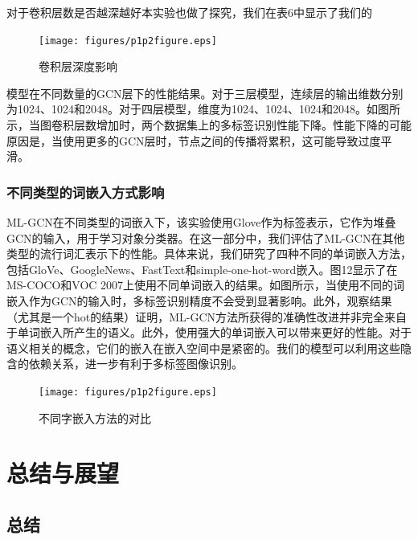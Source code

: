 对于卷积层数是否越深越好本实验也做了探究，我们在表6中显示了我们的
\begin{figure}[htbp!]
	\centering
	\texttt{[image: figures/p1p2figure.eps]}
	\caption{卷积层深度影响}\label{fig:simuP1P2Result}
	\vspace{-1em}
\end{figure}

模型在不同数量的GCN层下的性能结果。对于三层模型，连续层的输出维数分别为1024、1024和2048。对于四层模型，维度为1024、1024、1024和2048。如图所示，当图卷积层数增加时，两个数据集上的多标签识别性能下降。性能下降的可能原因是，当使用更多的GCN层时，节点之间的传播将累积，这可能导致过度平滑。

\subsection{不同类型的词嵌入方式影响}

ML-GCN在不同类型的词嵌入下，该实验使用Glove\cite{Xue2011Correlative}作为标签表示，它作为堆叠GCN的输入，用于学习对象分类器。在这一部分中，我们评估了ML-GCN在其他类型的流行词汇表示下的性能。具体来说，我们研究了四种不同的单词嵌入方法，包括GloVe\cite{Xue2011Correlative}、GoogleNews\cite{Guo2011Multi}、FastText和simple-one-hot-word嵌入。图12显示了在MS-COCO和VOC 2007上使用不同单词嵌入的结果。如图所示，当使用不同的词嵌入作为GCN的输入时，多标签识别精度不会受到显著影响。此外，观察结果（尤其是一个hot的结果）证明，ML-GCN方法所获得的准确性改进并非完全来自于单词嵌入所产生的语义。此外，使用强大的单词嵌入可以带来更好的性能。对于语义相关的概念，它们的嵌入在嵌入空间中是紧密的。我们的模型可以利用这些隐含的依赖关系，进一步有利于多标签图像识别。

\begin{figure}[htbp!]
	\centering
	\texttt{[image: figures/p1p2figure.eps]}
	\caption{不同字嵌入方法的对比}\label{fig:simuP1P2Result}
	\vspace{-1em}
\end{figure}

\chapter{总结与展望}

\section{总结}

